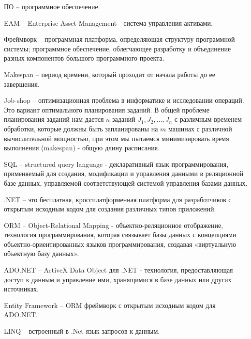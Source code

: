 
ПО -- программное обеспечение.

EAM -- Enterprise Asset Management - система управления активами.

Фреймворк -- программная платформа, определяющая структуру программной системы; программное обеспечение, облегчающее разработку и объединение разных компонентов большого программного проекта.

Makespan -- период времени, который проходит от начала работы до ее завершения.

Job-shop -- оптимизационная проблема в информатике и исследовании операций. Это вариант оптимального планирования заданий. В общей проблеме планирования заданий нам дается $n$ заданий $J_{1}, J_{2}, ..., J_{n}$ с различным временем обработки, которые должны быть запланированы на $m$ машинах с различной вычислительной мощностью, при этом мы пытаемся минимизировать время выполнения (makespan) - общую длину расписания.

SQL -- structured query language - декларативный язык программирования, применяемый для создания, модификации и управления данными в реляционной базе данных, управляемой соответствующей системой управления базами данных.

.NET -- это бесплатная, кроссплатформенная платформа для разработчиков с открытым исходным кодом для создания различных типов приложений.

ORM -- Object-Relational Mapping - объектно-реляционное отображение, технология программирования, которая связывает базы данных с концепциями объектно-ориентированных языков программирования, создавая «виртуальную объектную базу данных».

ADO.NET -- ActiveX Data Object для .NET - технология, предоставляющая доступ к данным и управление ими, хранящимися в базе данных или других источниках.

Entity Framework -- ORM фреймворк с открытым исходным кодом для ADO.NET.

LINQ -- встроенный в .Net язык запросов к данным.
\clearpage
